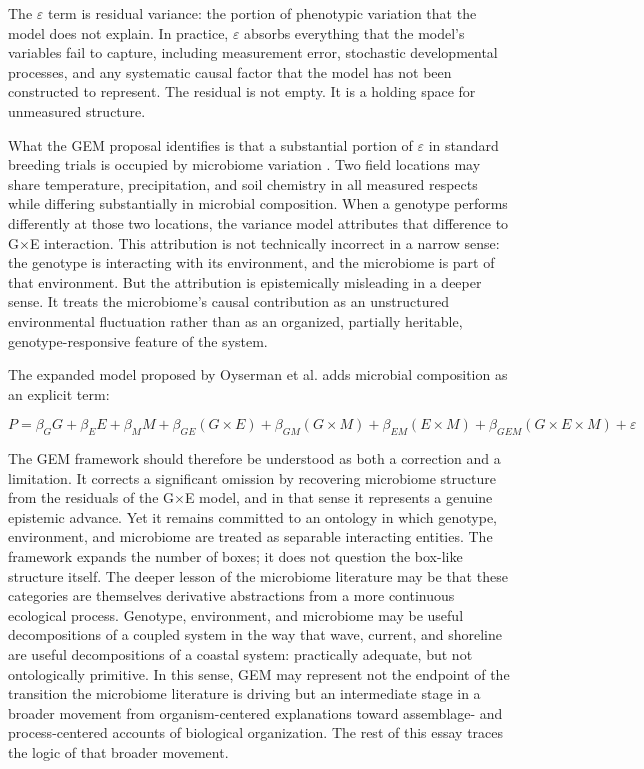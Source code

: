 \documentclass[11pt, a4paper]{article}
\begin{document}
The $\varepsilon$ term is residual variance: the portion of phenotypic variation that the model does not explain. In practice, $\varepsilon$ absorbs everything that the model's variables fail to capture, including measurement error, stochastic developmental processes, and any systematic causal factor that the model has not been constructed to represent. The residual is not empty. It is a holding space for unmeasured structure.

What the GEM proposal identifies is that a substantial portion of $\varepsilon$ in standard breeding trials is occupied by microbiome variation \citep{oyserman2021, zancarini2024}. Two field locations may share temperature, precipitation, and soil chemistry in all measured respects while differing substantially in microbial composition. When a genotype performs differently at those two locations, the variance model attributes that difference to G$\times$E interaction. This attribution is not technically incorrect in a narrow sense: the genotype is interacting with its environment, and the microbiome is part of that environment. But the attribution is epistemically misleading in a deeper sense. It treats the microbiome's causal contribution as an unstructured environmental fluctuation rather than as an organized, partially heritable, genotype-responsive feature of the system.

The expanded model proposed by Oyserman et al. adds microbial composition as an explicit term:

\[
P = \beta_G G + \beta_E E + \beta_M M + \beta_{GE}(G \times E) + \beta_{GM}(G \times M) + \beta_{EM}(E \times M) + \beta_{GEM}(G \times E \times M) + \varepsilon
\]

The GEM framework should therefore be understood as both a correction and a limitation. It corrects a significant omission by recovering microbiome structure from the residuals of the G$\times$E model, and in that sense it represents a genuine epistemic advance. Yet it remains committed to an ontology in which genotype, environment, and microbiome are treated as separable interacting entities. The framework expands the number of boxes; it does not question the box-like structure itself. The deeper lesson of the microbiome literature may be that these categories are themselves derivative abstractions from a more continuous ecological process. Genotype, environment, and microbiome may be useful decompositions of a coupled system in the way that wave, current, and shoreline are useful decompositions of a coastal system: practically adequate, but not ontologically primitive. In this sense, GEM may represent not the endpoint of the transition the microbiome literature is driving but an intermediate stage in a broader movement from organism-centered explanations toward assemblage- and process-centered accounts of biological organization. The rest of this essay traces the logic of that broader movement.
\end{document}
